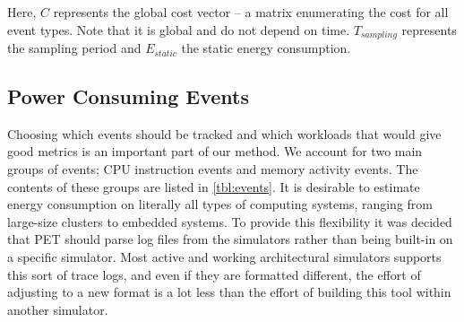 Here, $C$ represents the global cost vector -- a matrix enumerating the cost
for all event types. Note that it is global and do not depend on time.
$T_{sampling}$ represents the sampling period and $E_{static}$ the static energy
consumption.

\subsection{Power Consuming Events}
\label{subsec:powerevents}

Choosing which events should be tracked and which workloads that would give good
metrics is an important part of our method. We account for two main groups of
events; CPU instruction events and memory activity events. The contents of these
groups are listed in \autoref{tbl:events}. It is desirable to estimate energy
consumption on literally all types of computing systems, ranging from large-size
clusters to embedded systems. To provide this flexibility it was decided that
PET should parse log files from the simulators rather than being built-in on a
specific simulator. Most active and working architectural simulators supports this
sort of trace logs, and even if they are formatted different, the effort of
adjusting to a new format is a lot less than the effort of building this tool
within another simulator.

